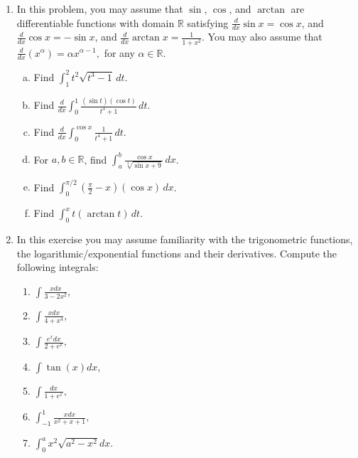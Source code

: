 \documentclass[openany, amssymb, psamsfonts]{amsart}
\newcommand{\bbR}{\mathbb{R}}
\theoremstyle{definition}
\numberwithin{equation}{section}
\begin{document}
\begin{enumerate}
\begin{proof}
Therefore, if $b = X^n,$ where $n> \frac{\Omega +1}{\Omega_X},$ then:
\begin{align*}
    |\int_1^b\frac{1}{x}\,dx - \Omega| &= |\int_1^{X^{n}}\frac{1}{x}\,dx - \Omega|\\
    &= n\Omega_X - \Omega\\
    &> \frac{\Omega +1}{\Omega_X}\Omega_X - \Omega\\
    &= 1
\end{align*}
Which is a contradiction.
 \end{proof}\vspace{4pt}     \hrule   \vspace{4pt}
\item
	In this problem, you may assume that $\sin$, $\cos$, and $\arctan$ are differentiable functions with domain $\bbR$ satisfying $\frac{d}{dx} \sin x = \cos x$, and  $\frac{d}{dx} \cos x = - \sin x$, and $\frac{d}{dx} \arctan x = \frac{1}{1 + x^2}$. You may also assume that 
	$\frac{d}{dx}(x^\alpha)=\alpha x^{\alpha -1},$ for any $\alpha\in\bbR.$ 

	\begin{enumerate}[(a)]
		\item Find $\displaystyle \int_1^2 t^2\sqrt{t^3 -1}\,dt$.
		\item Find $\displaystyle \frac{d}{dx} \int_0^1 \frac{(\sin t)(\cos t)}{t^3 + 1} \, dt$.
		\item Find $\displaystyle \frac{d}{dx} \int_0^{\cos x} \frac{1}{t^4 + 1} \, dt$.
		\item For $a, b \in \bbR$, find $\displaystyle \int_a^b \frac{\cos x}{\sqrt[4]{\sin x + 9}} \, dx$.
		\item Find $\displaystyle \int_0^{\pi/2} \left(\frac{\pi}{2} - x\right) (\cos x) \, dx$.
		\item Find $\displaystyle \int_0^x t (\arctan t) \, dt$.
	\end{enumerate}

\item In this exercise you may assume familiarity with the trigonometric functions, the logarithmic/exponential functions and their derivatives. Compute  the following integrals:
\begin{enumerate}
\item $\displaystyle\int\frac{x dx}{3-2x^2}, $

\item $\displaystyle\int \frac{x dx}{4+x^4}, $

\item $\displaystyle\int \frac{e^x dx}{2+e^x}, $

\item $\displaystyle\int \tan(x) dx, $

\item $\displaystyle\int \frac{ dx}{1+e^x}, $

\item $\displaystyle\int_{-1}^{1} \frac{ xdx}{x^2+x+1}, $

\item $\displaystyle\int_{0}^{a} x^2 \sqrt{a^2-x^2}dx.$
\end{enumerate}

\end{enumerate}
\end{document}
